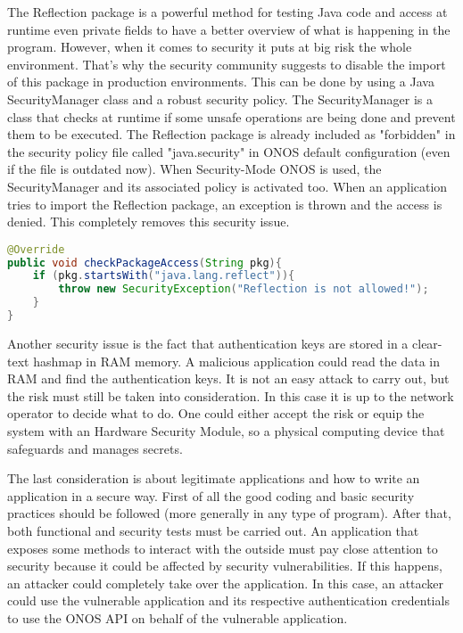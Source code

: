 \documentclass[a4paper,10pt]{memoir}
\begin{document}
The Reflection package is a powerful method for testing Java code and access at runtime even private fields to have a better overview of what is happening in the program. However, when it comes to security it puts at big risk the whole environment. That's why the security community suggests to disable the import of this package in production environments. This can be done by using a Java SecurityManager class and a robust security policy. The SecurityManager is a class that checks at runtime if some unsafe operations are being done and prevent them to be executed. The Reflection package is already included as "forbidden" in the security policy file called "java.security" in ONOS default configuration (even if the file is outdated now). When Security-Mode ONOS is used, the SecurityManager and its associated policy is activated too. When an application tries to import the Reflection package, an exception is thrown and the access is denied. This completely removes this security issue.
\begin{lstlisting}[language=Java]
@Override
public void checkPackageAccess(String pkg){
    if (pkg.startsWith("java.lang.reflect")){
        throw new SecurityException("Reflection is not allowed!");
    }
}
\end{lstlisting}

Another security issue is the fact that authentication keys are stored in a clear-text hashmap in RAM memory. A malicious application could read the data in RAM and find the authentication keys. It is not an easy attack to carry out, but the risk must still be taken into consideration. In this case it is up to the network operator to decide what to do. One could either accept the risk or equip the system with an Hardware Security Module, so a physical computing device that safeguards and manages secrets.
\medskip

The last consideration is about legitimate applications and how to write an application in a secure way. First of all the good coding and basic security practices should be followed (more generally in any type of program). After that, both functional and security tests must be carried out. An application that exposes some methods to interact with the outside must pay close attention to security because it could be affected by security vulnerabilities. If this happens, an attacker could completely take over the application. In this case, an attacker could use the vulnerable application and its respective authentication credentials to use the ONOS API on behalf of the vulnerable application.
\end{document}
